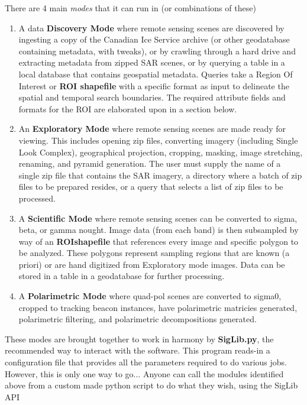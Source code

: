 \documentclass[letterpaper,10pt,openany,oneside]{sphinxmanual}
\begin{document}
There are 4 main \emph{modes} that it can run in (or combinations of these)
\begin{enumerate}
\item {} 
A data \textbf{Discovery Mode} where remote sensing scenes are discovered
by ingesting a copy of the Canadian Ice Service archive (or other
geodatabase containing metadata, with tweaks), or by crawling through
a hard drive and extracting metadata from zipped SAR scenes, or by
querying a table in a local database that contains geospatial
metadata. Queries take a Region Of Interest or \textbf{ROI shapefile} with
a specific format as input to delineate the
spatial and temporal search boundaries. The required attribute fields
and formats for the ROI are elaborated upon in a section below.

\item {} 
An \textbf{Exploratory Mode} where remote sensing scenes are made ready
for viewing. This includes opening zip files, converting imagery
(including Single Look Complex), geographical projection, cropping,
masking, image stretching, renaming, and pyramid generation. The user
must supply the name of a single zip file that contains the SAR
imagery, a directory where a batch of zip files to be prepared
resides, or a query that selects a list of zip files to be processed.

\item {} 
A \textbf{Scientific Mode} where remote sensing scenes can be converted to
sigma, beta, or gamma nought. Image data (from each band) is then subsampled
by way of an \textbf{ROIshapefile} that references every image and specific polygon to be
analyzed. These polygons represent sampling regions that are known
(a priori) or are hand digitized from Exploratory mode
images. Data can be stored in a table in a geodatabase for further
processing.

\item {} 
A \textbf{Polarimetric Mode} where quad-pol scenes are converted to sigma0,
cropped to tracking beacon instances, have polarimetric matricies generated,
polarimetric filtering, and polarimetric decompositions generated.

\end{enumerate}

These modes are brought together to work in harmony by \textbf{SigLib.py}, the
recommended way to interact with the software. This program reads-in a
configuration file that provides all the parameters required to do
various jobs. However, this is only one way to go... Anyone can call the
modules identified above from a custom made python script to do what
they wish, using the SigLib API
\end{document}
